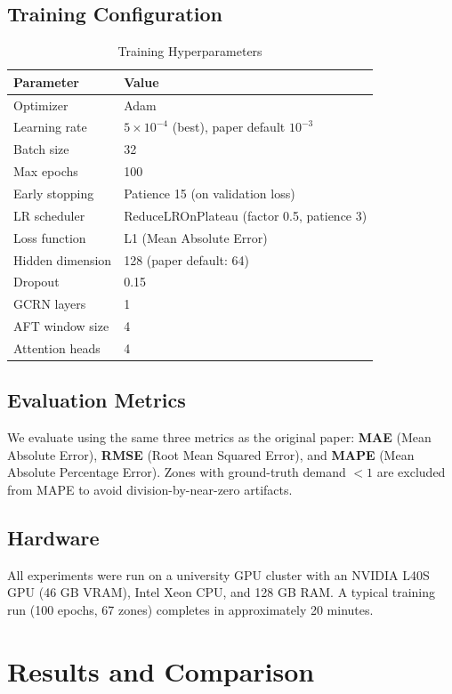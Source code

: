 \documentclass{rapportECL}
\begin{document}
\subsection{Training Configuration}
\begin{table}[H]
\centering
\caption{Training Hyperparameters}
\begin{tabular}{@{}ll@{}}
\toprule
\textbf{Parameter} & \textbf{Value} \\ \midrule
Optimizer       & Adam \\
Learning rate   & $5 \times 10^{-4}$ (best), paper default $10^{-3}$ \\
Batch size      & 32 \\
Max epochs      & 100 \\
Early stopping  & Patience 15 (on validation loss) \\
LR scheduler    & ReduceLROnPlateau (factor 0.5, patience 3) \\
Loss function   & L1 (Mean Absolute Error) \\
Hidden dimension & 128 (paper default: 64) \\
Dropout         & 0.15 \\
GCRN layers     & 1 \\
AFT window size & 4 \\
Attention heads & 4 \\ \bottomrule
\end{tabular}
\end{table}

\subsection{Evaluation Metrics}
We evaluate using the same three metrics as the original paper: \textbf{MAE} (Mean Absolute Error), \textbf{RMSE} (Root Mean Squared Error), and \textbf{MAPE} (Mean Absolute Percentage Error). Zones with ground-truth demand $< 1$ are excluded from MAPE to avoid division-by-near-zero artifacts.

\subsection{Hardware}
All experiments were run on a university GPU cluster with an NVIDIA L40S GPU (46 GB VRAM), Intel Xeon CPU, and 128 GB RAM. A typical training run (100 epochs, 67 zones) completes in approximately 20 minutes.

\section{Results and Comparison}
\end{document}
